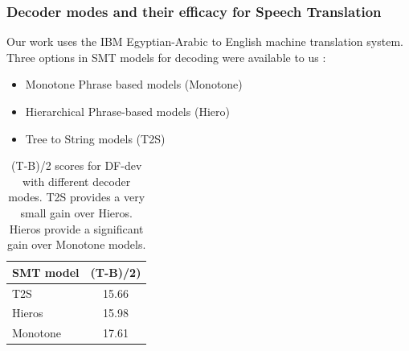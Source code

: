 \documentclass{beamer}
\begin{document}
\begin{frame}
\frametitle{Decoder modes and their efficacy for Speech Translation}
Our work uses the IBM Egyptian-Arabic to English machine translation system.
Three options in SMT models for decoding were available to us : 
\begin{itemize}
\item Monotone Phrase based models (Monotone)
\item Hierarchical Phrase-based models (Hiero)
\item Tree to String models (T2S)
\end{itemize}

\begin{table}
\begin{center}
\begin{tabular}{| l | c |}
  \hline 
  \textbf{SMT model} & \textbf{(T-B)/2)} \\ \hline
  T2S & 15.66\\
  \hline
  Hieros & 15.98\\
  \hline
  Monotone & 17.61\\
  \hline
\end{tabular}
\caption{(T-B)/2 scores for DF-dev with different decoder modes. T2S provides a very small gain over Hieros. Hieros provide 
a significant gain over Monotone models.}
\label{tab:cross-bleu}
\end{center}
\end{table} 
\end{frame}
\end{document}
